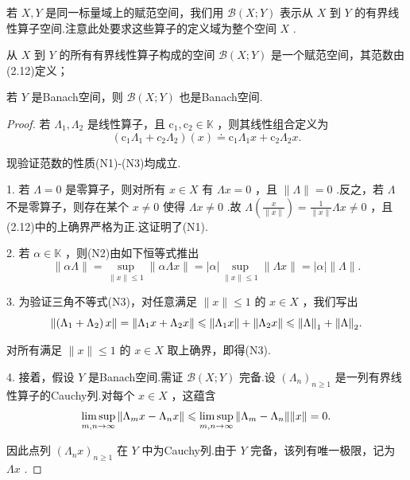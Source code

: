 若 $X,Y$ 是同一标量域上的赋范空间，我们用 $\mathcal{B}\left( {X;Y}\right)$ 表示从 $X$ 到 $Y$ 的有界线性算子空间.注意此处要求这些算子的定义域为整个空间 $X$ .
\begin{theorem}[有界线性算子空间]
    从 $X$ 到 $Y$ 的所有有界线性算子构成的空间 $\mathcal{B}\left( {X;Y}\right)$ 是一个赋范空间，其范数由(2.12)定义；\par
    若 $Y$ 是Banach空间，则 $\mathcal{B}\left( {X;Y}\right)$ 也是Banach空间.
\end{theorem}
\begin{proof}
    若 ${\Lambda }_{1},{\Lambda }_{2}$ 是线性算子，且 ${\mathrm{c}}_{1},{\mathrm{c}}_{2} \in  \mathbb{K}$ ，则其线性组合定义为
\[
\left( {{\mathrm{c}}_{1}{\Lambda }_{1} + {c}_{2}{\Lambda }_{2}}\right) \left( x\right)  \doteq  {\mathrm{c}}_{1}{\Lambda }_{1}x + {\mathrm{c}}_{2}{\Lambda }_{2}x.
\]

现验证范数的性质(N1)-(N3)均成立.

1. 若 $\Lambda  = 0$ 是零算子，则对所有 $x \in  X$ 有 ${\Lambda x} = 0$ ，且 $\| \Lambda \|  = 0$ .反之，若 $\Lambda$ 不是零算子，则存在某个 $x \neq  0$ 使得 ${\Lambda x} \neq  0$ .故 $\Lambda \left( \frac{x}{\| x\| }\right)  = \frac{1}{\| x\| }{\Lambda x} \neq  0$ ，且(2.12)中的上确界严格为正.这证明了(N1).

2. 若 $\alpha  \in  \mathbb{K}$ ，则(N2)由如下恒等式推出
\[
\| {\alpha \Lambda }\|  = \mathop{\sup }\limits_{{\| x\|  \leq  1}}\| {\alpha \Lambda x}\|  = \left| \alpha \right| \mathop{\sup }\limits_{{\| x\|  \leq  1}}\| {\Lambda x}\|  = \left| \alpha \right| \| \Lambda \| .
\]

3. 为验证三角不等式(N3)，对任意满足 $\| x\|  \leq  1$ 的 $x \in  X$ ，我们写出
\[
\norm{\left( {{\Lambda }_{1} + {\Lambda }_{2}}\right) x} = \norm{{\Lambda }_{1}x + {\Lambda }_{2}x} \leqslant  \norm{{\Lambda }_{1}x} + \norm{{\Lambda }_{2}x} \leqslant  \norm{\Lambda }_{1} + \norm{\Lambda }_{2}.
\]

对所有满足 $\| x\|  \leq  1$ 的 $x \in  X$ 取上确界，即得(N3).

4. 接着，假设 $Y$ 是Banach空间.需证 $\mathcal{B}\left( {X;Y}\right)$ 完备.设 ${\left( {\Lambda }_{n}\right) }_{n \geq  1}$ 是一列有界线性算子的Cauchy列.对每个 $x \in  X$ ，这蕴含
\[
\mathop{\limsup }\limits_{{m,n \rightarrow  \infty }}\norm{{\Lambda }_{m}x - {\Lambda }_{n}x} \leqslant  \mathop{\limsup }\limits_{{m,n \rightarrow  \infty }}\norm{{\Lambda }_{m} - {\Lambda }_{n}}\| x\|  = 0.
\]

因此点列 ${\left( {\Lambda }_{n}x\right) }_{n \geq  1}$ 在 $Y$ 中为Cauchy列.由于 $Y$ 完备，该列有唯一极限，记为 ${\Lambda x}$ .


\end{proof}

